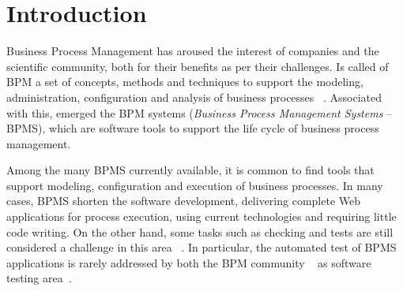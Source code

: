 \documentclass[runningheads,a4paper]{llncs}
\begin{document}
\section{Introduction}


Business Process Management has aroused the interest of companies and the scientific community, both for their benefits as per their challenges. Is called of BPM a set of concepts, methods and techniques to support the modeling, administration, configuration and analysis of business processes  ~\cite{weske}. Associated with this, emerged the BPM systems (\emph{Business Process Management Systems} -- BPMS), which are software tools to support the life cycle of business process management.


Among the many BPMS currently available, it is common to find tools that support modeling, configuration and execution of business processes. In many cases, BPMS shorten the software development, delivering complete Web applications for process execution, using current technologies and requiring little code writing. On the other hand, some tasks such as checking and tests are still considered a challenge in this area ~\cite{aalst2013survey}. In particular, the automated test of BPMS applications is rarely addressed by both the BPM community ~\cite{weske} as software testing area~\cite{graham2012experiences}.
 
\end{document}
